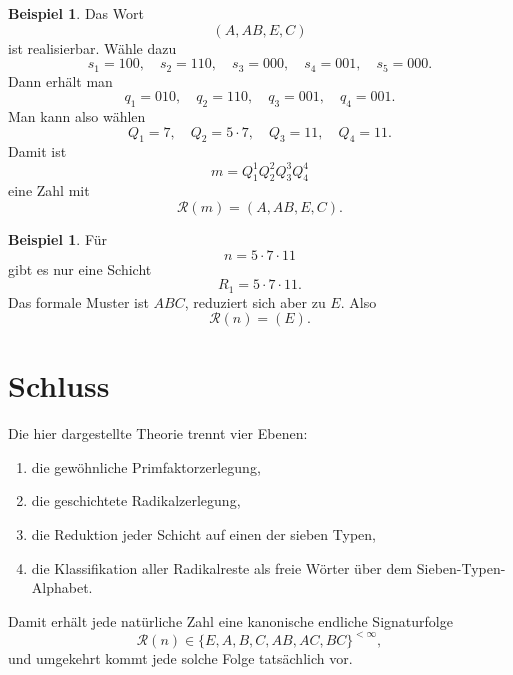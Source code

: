\documentclass[11pt,a4paper]{article}
\theoremstyle{definition}
\newtheorem{beispiel}[satz]{Beispiel}
\theoremstyle{remark}
\newcommand{\RRest}{\mathcal{R}}
\begin{document}
	\begin{beispiel}
		Das Wort
		\[
		(A,AB,E,C)
		\]
		ist realisierbar. Wähle dazu
		\[
		s_1=100,\quad s_2=110,\quad s_3=000,\quad s_4=001,\quad s_5=000.
		\]
		Dann erhält man
		\[
		q_1=010,\quad q_2=110,\quad q_3=001,\quad q_4=001.
		\]
		Man kann also wählen
		\[
		Q_1=7,\quad Q_2=5\cdot 7,\quad Q_3=11,\quad Q_4=11.
		\]
		Damit ist
		\[
		m=Q_1^1Q_2^2Q_3^3Q_4^4
		\]
		eine Zahl mit
		\[
		\RRest(m)=(A,AB,E,C).
		\]
	\end{beispiel}
	
	\begin{beispiel}
		Für
		\[
		n=5\cdot 7\cdot 11
		\]
		gibt es nur eine Schicht
		\[
		R_1=5\cdot 7\cdot 11.
		\]
		Das formale Muster ist \(ABC\), reduziert sich aber zu \(E\). Also
		\[
		\RRest(n)=(E).
		\]
	\end{beispiel}
	
	\section{Schluss}
	
	Die hier dargestellte Theorie trennt vier Ebenen:
	\begin{enumerate}[label=\arabic*.]
		\item die gewöhnliche Primfaktorzerlegung,
		\item die geschichtete Radikalzerlegung,
		\item die Reduktion jeder Schicht auf einen der sieben Typen,
		\item die Klassifikation aller Radikalreste als freie Wörter über dem Sieben-Typen-Alphabet.
	\end{enumerate}
	
	Damit erhält jede natürliche Zahl eine kanonische endliche Signaturfolge
	\[
	\RRest(n)\in\{E,A,B,C,AB,AC,BC\}^{<\infty},
	\]
	und umgekehrt kommt jede solche Folge tatsächlich vor.
	
\end{document}
